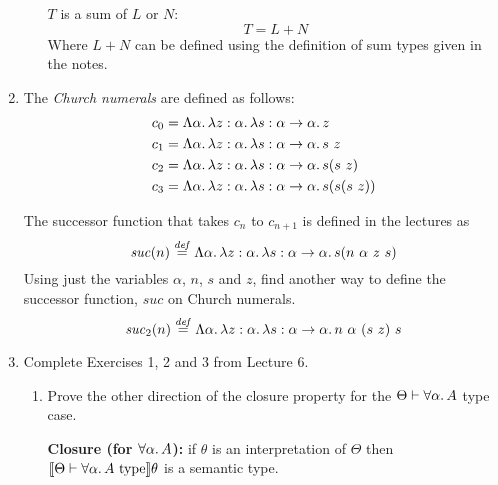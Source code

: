 \documentclass[10pt,\jkfside,a4paper]{article}
\newcommand{\type}[1]{\ensuremath{#1\ \text{type}}}
\newcommand{\brk}[1]{\ensuremath{\llbracket #1 \rrbracket}}
\begin{document}
\begin{enumerate}
\begin{enumerate}[label=(\arabic*)]
        $T$ is a sum of $L$ or $N$:
        \[
            T = L + N
        \]
        Where $L + N$ can be defined using the definition of sum types given in the notes.

    \end{enumerate}

    \item The \textit{Church numerals} are defined as follows:
    \begin{align*}
        c_0 &= \Lambda \alpha\ldotp \lambda z: \alpha \ldotp \lambda s: \alpha \to \alpha\ldotp z \\
        c_1 &= \Lambda \alpha\ldotp \lambda z: \alpha \ldotp \lambda s: \alpha \to \alpha\ldotp s\ z \\
        c_2 &= \Lambda \alpha\ldotp \lambda z: \alpha \ldotp \lambda s: \alpha \to \alpha\ldotp s(s\ z) \\
        c_3 &= \Lambda \alpha\ldotp \lambda z: \alpha \ldotp \lambda s: \alpha \to \alpha\ldotp s(s(s\ z))
    \end{align*}

    The successor function that takes $c_n$ to $c_{n + 1}$ is defined in the lectures as
    \[
        \mathit{suc}(n) \stackrel{\mathit{def}}{=} \Lambda \alpha\ldotp \lambda z: \alpha\ldotp \lambda s: \alpha \to \alpha\ldotp s(n\ \alpha\ z\ s)
    \]
    Using just the variables $\alpha$, $n$, $s$ and $z$, find another way to define the successor function, $\mathit{suc}$ on Church numerals.
    \[
        \mathit{suc}_2(n) \stackrel{\mathit{def}}{=} \Lambda \alpha\ldotp \lambda z: \alpha\ldotp \lambda s: \alpha \to \alpha\ldotp n\ \alpha\ (s\ z)\ s
    \]

    \item Complete Exercises 1, 2 and 3 from Lecture 6.

    \begin{enumerate}[label=(\arabic*)]

        \item Prove the other direction of the closure property for the $\Theta \vdash \forall \alpha\ldotp A$ type case.

        \textbf{Closure (for $\forall \alpha\ldotp A$):} if $\theta$ is an interpretation of $\Theta$ then $\brk{\Theta \vdash \type{\forall \alpha\ldotp A}}\theta$ is a semantic type.


\end{enumerate}
\end{enumerate}
\end{document}
